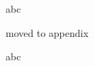 \documentclass{beamer}
\begin{document}
\begin{frame}
    abc
\end{frame} 

\begin{subframe}
    moved to appendix
\end{subframe}

\begin{frame}
    abc
\end{frame} 

\appendix

\appendsubframes
\end{document}
